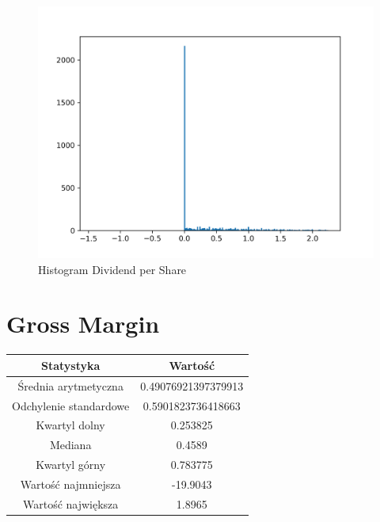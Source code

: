 \documentclass{article}
\begin{document}
\begin{figure}[h!]
    \includegraphics[width=\linewidth]{variables/Dividend per Share.png}
    \caption{Histogram Dividend per Share }
\end{figure}\section{ Gross Margin }

\begin{center}
    \begin{tabular}{|c | c|} 
    \hline
    Statystyka & Wartość \\
    \hline\hline
    Średnia arytmetyczna & 0.49076921397379913 \\ 
    \hline
    Odchylenie standardowe & 0.5901823736418663 \\
    \hline
    Kwartyl dolny & 0.253825 \\
    \hline
    Mediana & 0.4589 \\
    \hline
    Kwartyl górny & 0.783775 \\
    \hline
    Wartość najmniejsza & -19.9043 \\
    \hline
    Wartość największa & 1.8965 \\
    \hline
   \end{tabular}
\end{center}
\end{document}
